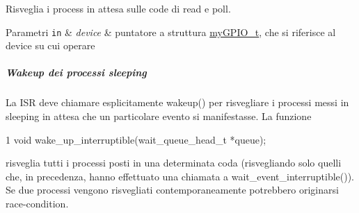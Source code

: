 Risveglia i process in attesa sulle code di read e poll. 


\begin{DoxyParams}[1]{Parametri}
\mbox{\tt in}  & {\em device} & puntatore a struttura \hyperlink{structmy_g_p_i_o__t}{my\+G\+P\+I\+O\+\_\+t}, che si riferisce al device su cui operare\\
\hline
\end{DoxyParams}
\subparagraph*{Wakeup dei processi sleeping}

La I\+S\+R deve chiamare esplicitamente wakeup() per risvegliare i processi messi in sleeping in attesa che un particolare evento si manifestasse. La funzione 
\begin{DoxyCode}
1 void wake\_up\_interruptible(wait\_queue\_head\_t *queue);
\end{DoxyCode}
 risveglia tutti i processi posti in una determinata coda (risvegliando solo quelli che, in precedenza, hanno effettuato una chiamata a wait\+\_\+event\+\_\+interruptible()). Se due processi vengono risvegliati contemporaneamente potrebbero originarsi race-\/condition. 